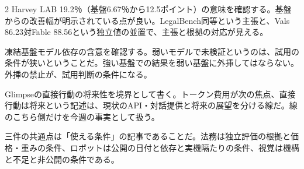 \documentclass[lualatex,a4paper,10pt]{jlreq}
\begin{document}
\begin{multicols}{2}
Harvey LAB 19.2％（基盤6.67％から12.5ポイント）の意味を確認する。基盤からの改善幅が明示されている点が良い。LegalBench同等という主張と、Vals 86.23対Fable 88.56という独立値の並置で、主張と根拠の対応が見える。
\cite{B55,B53,B54}


凍結基盤モデル依存の含意を確認する。弱いモデルで未検証というのは、試用の条件が狭いということだ。強い基盤での結果を弱い基盤に外挿してはならない。外挿の禁止が、試用判断の条件になる。
\cite{B57,B56}


Glimpseの直接行動の将来性を境界として書く。トークン費用が次の焦点、直接行動は将来という記述は、現状のAPI・対話提供と将来の展望を分ける線だ。線のこちら側だけを今週の事実として扱う。
\cite{B58,B59,B88}


三件の共通点は「使える条件」の記事であることだ。法務は独立評価の根拠と価格・重みの条件、ロボットは公開の日付と依存と実機隔たりの条件、視覚は機構と不足と非公開の条件である。
\cite{B55,B53,B54,B57,B56,B58,B59,B88}
\end{multicols} %
\end{document}
